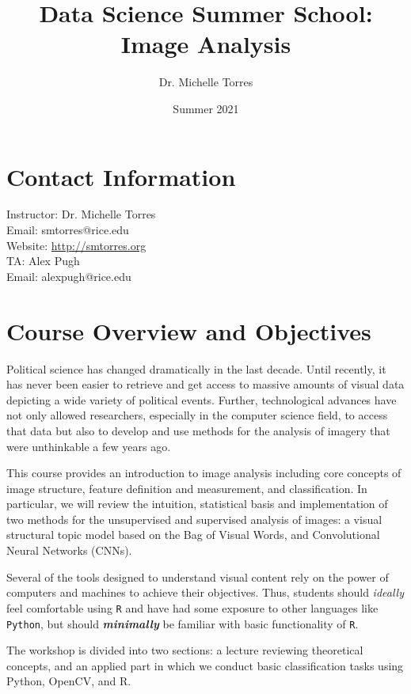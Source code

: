 \documentclass[11pt]{article}
\title{Data Science Summer School: Image Analysis}
\author{Dr. Michelle Torres}
\date{Summer 2021}
\begin{document}
\maketitle

\begin{flushleft}
\section{Contact Information}\label{contact-information}

Instructor: Dr. Michelle Torres\\
Email: smtorres@rice.edu\\
Website: \url{http://smtorres.org}\\
TA: Alex Pugh\\
Email: alexpugh@rice.edu\\

\section{Course Overview and Objectives}\label{course-objectives-and-learning-outcomes}
Political science has changed dramatically in the last decade. Until recently, it has never been easier to retrieve and get access to massive amounts of visual data depicting a wide variety of political events. Further, technological advances have not only allowed researchers, especially in the computer science field, to access that data but also to develop and use methods for the analysis of imagery that were unthinkable a few years ago. 

This course provides an introduction to image analysis including core concepts of image structure, feature definition and measurement, and classification. In particular, we will review the intuition, statistical basis and implementation of two methods for the unsupervised and supervised analysis of images: a visual structural topic model based on the Bag of Visual Words, and Convolutional Neural Networks (CNNs). 


Several of the tools designed to understand visual content rely on the power of computers and machines to achieve their objectives. Thus, students should \emph{ideally} feel comfortable using \texttt{R} and have had some exposure to other languages like \texttt{Python}, but should \textbf{\emph{minimally}} be familiar with basic functionality of \texttt{R}.

The workshop is divided into two sections: a lecture reviewing theoretical concepts, and an applied part in which we conduct basic classification tasks using Python, OpenCV, and R.


\end{flushleft}
\end{document}
